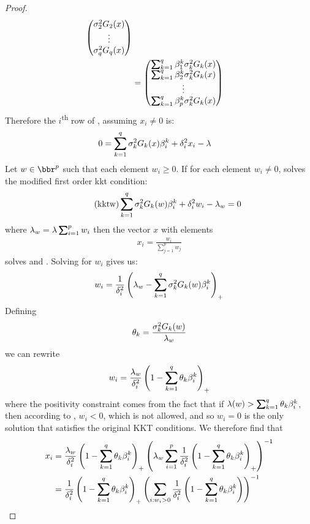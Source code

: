 \documentclass[12pt,leqno,letterpaper]{article}
\begin{document}
\begin{proof}
\begin{align}
\begin{pmatrix}
\gs_2^2 G_2(x)\\
\vdots\\
\gs_q^2 G_q(x)
\end{pmatrix}\\
&= \begin{pmatrix}
\sum_{k=1}^q \gb^k_1 \gs_k^2 G_k(x) \\
\sum_{k=1}^q \gb^k_2 \gs_k^2 G_k(x) \\
\vdots\\
\sum_{k=1}^q \gb^k_p \gs_k^2 G_k(x) 
\end{pmatrix}\\
\end{align}
Therefore the $i$\textsuperscript{th} row of , assuming $x_i \neq 0$ is:
\begin{align}
0&=\sum_{k=1}^q \gs^2_k G_k(x) \gb^k_i + \gd_i^2 x_i - \gl 
\end{align}
Let $w \in \bbr^p$ such that each element $w_i \geq 0$.  If for each element $w_i \neq 0$, solves the modified first order kkt condition:
\begin{align}\label{kktw}
\tag{kktw} \sum_{k=1}^q \gs_k^2 G_k(w) \gb_i^k +\gd_i^2 w_i - \gl_w = 0
\end{align}
where $\gl_w = \gl\sum_{i=1}^p w_i$
then the vector $x$ with elements
\begin{align}
x_i = \frac{w_i}{\sum_{j=1}^p w_j}
\end{align}
solves  and .  Solving for $w_i$ gives us:
\begin{align}
w_i = \frac{1}{\gd_i^2}\paren{\gl_w - \sum_{k=1}^q \gs_k^2 G_k(w) \gb_i^k}_+
\end{align}
Defining
\begin{align} \label{thetadef}
\theta_k = \frac{\sigma_k^2 G_k(w)}{\lambda_w}
\end{align}
we can rewrite
\begin{align}
w_i = \frac{\gl_w}{\gd_i^2}\paren{1 - \sum_{k=1}^q \theta_k \gb_i^k}_+
\end{align}
where the positivity constraint comes from the fact that if $\gl(w)> \sum_{k=1}^q \theta_k \gb_i^k$, then according to , $w_i<0$, which is not allowed, and so $w_i=0$ is the only solution that satisfies the original KKT conditions.  We therefore find that
\begin{align}
x_i &= \frac{\gl_w}{\gd_i^2}\paren{1 - \sum_{k=1}^q \theta_k\gb_i^k}_+ \paren{ \gl_w\sum_{i=1}^p\frac{1}{\gd_i^2}\paren{1 - \sum_{k=1}^q \theta_k \gb_i^k}_+}^{-1}\\
&=\frac{1}{\gd_i^2}\paren{1 - \sum_{k=1}^q \theta_k \gb_i^k}_+ \paren{ \sum_{i:w_i>0} \frac{1}{\gd_i^2}\paren{1 - \sum_{k=1}^q \theta_k \gb_i^k}}^{-1}\\

\end{align}
\end{proof}
\end{document}
